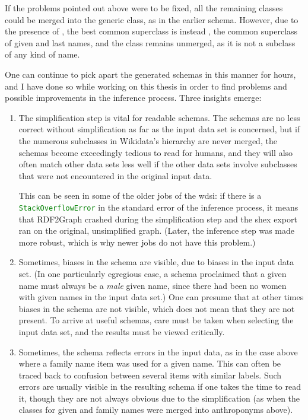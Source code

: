 If the problems pointed out above were to be fixed,
all the remaining classes could be merged into the generic  class,
as in the earlier \gls{schema}.
However, due to the presence of ,
the best common superclass is instead ,
the common superclass of given and last names,
and the  class remains unmerged,
as it is not a subclass of any kind of name.

One can continue to pick apart the generated \glspl{schema} in this manner for hours,
and I have done so while working on this thesis
in order to find problems and possible improvements in the inference process.
Three insights emerge:

\begin{enumerate}
\item The simplification step is vital for readable \glspl{schema}.
  The \glspl{schema} are no less correct without simplification as far as the input data set is concerned,
  but if the numerous subclasses in \gls{Wikidata}’s hierarchy are never merged,
  the \glspl{schema} become exceedingly tedious to read for humans,
  and they will also often match other data sets less well
  if the other data sets involve subclasses that were not encountered in the original input data.

  This can be seen in some of the older jobs of the \gls{wdsi}:
  if there is a \lstinline[language=java]{StackOverflowError} in the standard error of the inference process,
  it means that \gls{RDF2Graph} crashed during the simplification step
  and the \gls{shex} export ran on the original, unsimplified graph.
  (Later, the inference step was made more robust,
  which is why newer jobs do not have this problem.)

\item Sometimes, biases in the \gls{schema} are visible, due to biases in the input data set.
  (In one particularly egregious case,
  a \gls{schema} proclaimed that a given name must always be a \emph{male} given name,
  since there had been no women with given names in the input data set.)
  One can presume that at other times biases in the \gls{schema} are not visible,
  which does not mean that they are not present. %
  To arrive at useful \glspl{schema},
  care must be taken when selecting the input data set,
  and the results must be viewed critically. %

\item Sometimes, the \gls{schema} reflects errors in the input data,
  as in the case above where a family name \gls{item} was used for a given name.
  This can often be traced back to confusion between several \glspl{item} with similar labels.
  Such errors are usually visible in the resulting \gls{schema} if one takes the time to read it,
  though they are not always obvious due to the simplification
  (as when the classes for given and family names were merged into anthroponyms above).
\end{enumerate}

